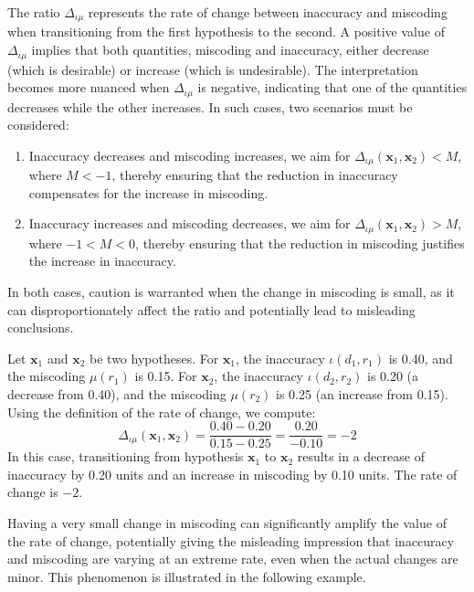 The ratio $\Delta_{\iota \mu}$ represents the rate of change between inaccuracy and miscoding when transitioning from the first hypothesis to the second. A positive value of $\Delta_{\iota \mu}$ implies that both quantities, miscoding and inaccuracy, either decrease (which is desirable) or increase (which is undesirable). The interpretation becomes more nuanced when $\Delta_{\iota \mu}$ is negative, indicating that one of the quantities decreases while the other increases. In such cases, two scenarios must be considered:

\begin{enumerate}[label=(\roman*)]
\item Inaccuracy decreases and miscoding increases, we aim for $\Delta_{\iota \mu}(\mathbf{x}_1, \mathbf{x}_2) < M$, where $M < -1$, thereby ensuring that the reduction in inaccuracy compensates for the increase in miscoding.
\item Inaccuracy increases and miscoding decreases, we aim for $\Delta_{\iota \mu}(\mathbf{x}_1, \mathbf{x}_2) > M$, where $-1 < M < 0$, thereby ensuring that the reduction in miscoding justifies the increase in inaccuracy.
\end{enumerate}

In both cases, caution is warranted when the change in miscoding is small, as it can disproportionately affect the ratio and potentially lead to misleading conclusions.

\begin{example}
Let $\mathbf{x}_1$ and $\mathbf{x}_2$ be two hypotheses. For $\mathbf{x}_1$, the inaccuracy $\iota(d_1, r_1)$ is 0.40, and the miscoding $\mu(r_1)$ is 0.15. For $\mathbf{x}_2$, the inaccuracy $\iota(d_2, r_2)$ is 0.20 (a decrease from 0.40), and the miscoding $\mu(r_2)$ is 0.25 (an increase from 0.15). Using the definition of the rate of change, we compute:
\[
\Delta_{\iota \mu} ( \mathbf{x}_1, \mathbf{x}_2 ) = \frac{0.40 - 0.20}{0.15 - 0.25} = \frac{0.20}{-0.10} = -2
\]
In this case, transitioning from hypothesis $\mathbf{x}_1$ to $\mathbf{x}_2$ results in a decrease of inaccuracy by 0.20 units and an increase in miscoding by 0.10 units. The rate of change is $-2$.
\end{example}

Having a very small change in miscoding can significantly amplify the value of the rate of change, potentially giving the misleading impression that inaccuracy and miscoding are varying at an extreme rate, even when the actual changes are minor. This phenomenon is illustrated in the following example.


